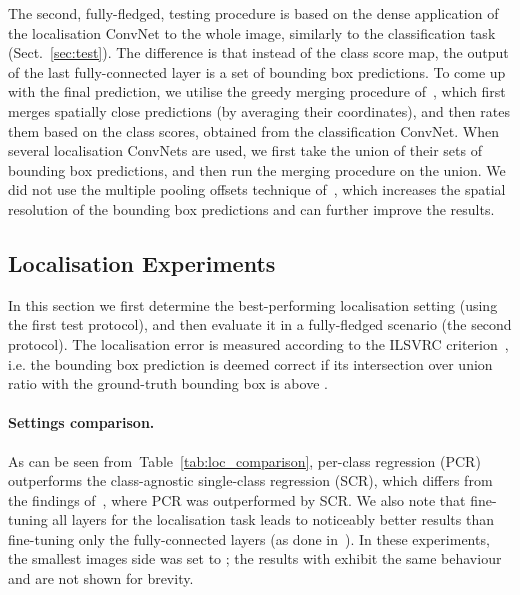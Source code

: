 \documentclass{article} \usepackage{iclr2015,times}
\makeatletter
\newcommand{\tblref}[1]{Table~\ref{#1}}
\newcommand{\sref}[1]{Sect.~\ref{#1}}
\newcommand*{\ie}{i.e.\@\xspace}
\makeatother
\begin{document}
The second, fully-fledged, testing procedure is based on the dense application of the localisation ConvNet to the whole image, similarly to the classification task (\sref{sec:test}).
The difference is that instead of the class score map, the output of the last fully-connected layer is a set of bounding box predictions.
To come up with the final prediction, we utilise the greedy merging procedure of~\citet{Sermanet14}, which first merges spatially close predictions (by averaging their coordinates), and then rates them
based on the class scores, obtained from the classification ConvNet. 
When several localisation ConvNets are used, we first take the union of their sets of bounding box predictions, and then run the merging procedure on the union.
We did not use the multiple pooling offsets technique of~\citet{Sermanet14}, which increases the spatial resolution of the bounding box predictions 
and can further improve the results.

\subsection{Localisation Experiments}
\label{sec:loc_eval}

In this section we first determine the best-performing localisation setting (using the first test protocol),
and then evaluate it in a fully-fledged scenario (the second protocol).
The localisation error is measured according to the ILSVRC criterion~\citep{Russakovsky14}, \ie the bounding box prediction is deemed correct if its intersection over union ratio with the ground-truth
bounding box is above .

\paragraph{Settings comparison.}
As can be seen from~\tblref{tab:loc_comparison}, per-class regression (PCR) outperforms the class-agnostic single-class regression (SCR), which differs from the findings of~\citet{Sermanet14},
where PCR was outperformed by SCR. We also note that fine-tuning all layers for the localisation task leads to noticeably better results than fine-tuning only the fully-connected layers 
(as done in~\citep{Sermanet14}). In these experiments, the smallest images side was set to ; the results with  exhibit the same behaviour and are not shown for brevity.
\end{document}

